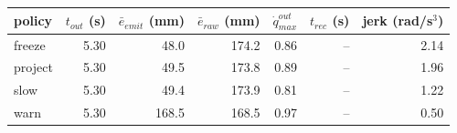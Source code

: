 \begin{tabular}{lrrrrrr}
\toprule
policy & $t_{out}$ (s) & $\bar{e}_{emit}$ (mm) & $\bar{e}_{raw}$ (mm) & $\dot{q}_{max}^{out}$ & $t_{rec}$ (s) & jerk (rad/s$^3$) \\
\midrule
freeze & 5.30 & 48.0 & 174.2 & 0.86 & -- & 2.14 \\
project & 5.30 & 49.5 & 173.8 & 0.89 & -- & 1.96 \\
slow & 5.30 & 49.4 & 173.9 & 0.81 & -- & 1.22 \\
warn & 5.30 & 168.5 & 168.5 & 0.97 & -- & 0.50 \\
\bottomrule
\end{tabular}
